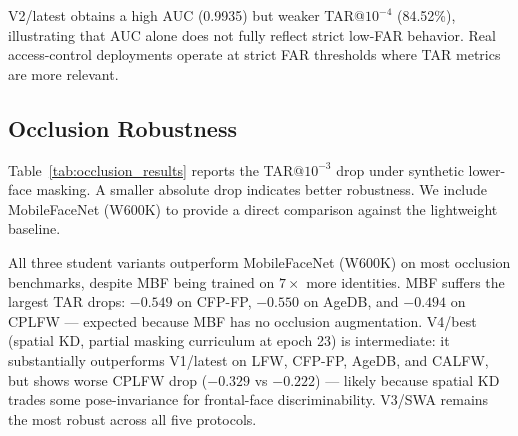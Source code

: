 V2/latest obtains a high AUC (0.9935) but weaker TAR@$10^{-4}$ (84.52\%), illustrating that AUC alone does not fully reflect strict low-FAR behavior. Real access-control deployments operate at strict FAR thresholds where TAR metrics are more relevant.

\subsection{Occlusion Robustness}

Table~\ref{tab:occlusion_results} reports the TAR@$10^{-3}$ drop under synthetic lower-face masking. A smaller absolute drop indicates better robustness. We include MobileFaceNet (W600K) to provide a direct comparison against the lightweight baseline.

\begin{table}[h]
\centering
\caption{Occlusion robustness: TAR@$10^{-3}$ drop (masked$-$clean) under synthetic lower-face masking. Smaller absolute value is better.}
\label{tab:occlusion_results}
\end{table}

All three student variants outperform MobileFaceNet (W600K) on most occlusion benchmarks, despite MBF being trained on $7\times$ more identities. MBF suffers the largest TAR drops: $-0.549$ on CFP-FP, $-0.550$ on AgeDB, and $-0.494$ on CPLFW — expected because MBF has no occlusion augmentation. V4/best (spatial KD, partial masking curriculum at epoch 23) is intermediate: it substantially outperforms V1/latest on LFW, CFP-FP, AgeDB, and CALFW, but shows worse CPLFW drop ($-0.329$ vs $-0.222$) — likely because spatial KD trades some pose-invariance for frontal-face discriminability. V3/SWA remains the most robust across all five protocols.

